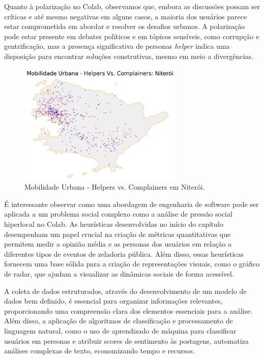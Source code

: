 Quanto à polarização no Colab, observamos que, embora as discussões possam ser críticas e até mesmo negativas em alguns casos, a maioria dos usuários parece estar comprometida em abordar e resolver os desafios urbanos. A polarização pode estar presente em debates políticos e em tópicos sensíveis, como corrupção e gentrificação, mas a presença significativa de personas \textit{helper} indica uma disposição para encontrar soluções construtivas, mesmo em meio a divergências.

\begin{figure}[htb]
	\centering
	\includegraphics[width=0.7\textwidth]{images/network_niteroi_personas_plot.png}
	\caption{Mobilidade Urbana - Helpers vs. Complainers em Niterói.}
	\label{fig:network_niteroi_personas_plot}
\end{figure}

É interessante observar como uma abordagem de engenharia de software pode ser aplicada a um problema social complexo como a análise de pressão social hiperlocal no Colab. As heurísticas desenvolvidas no início do capítulo desempenham um papel crucial na criação de métricas quantitativas que permitem medir a opinião média e as personas dos usuários em relação a diferentes tipos de eventos de zeladoria pública. Além disso, essas heurísticas fornecem uma base sólida para a criação de representações visuais, como o gráfico de radar, que ajudam a visualizar as dinâmicas sociais de forma acessível.

A coleta de dados estruturados, através do desenvolvimento de um modelo de dados bem definido, é essencial para organizar informações relevantes, proporcionando uma compreensão clara dos elementos essenciais para a análise. Além disso, a aplicação de algoritmos de classificação e processamento de linguagem natural, como o uso de aprendizado de máquina para classificar usuários em personas e atribuir scores de sentimento às postagens, automatiza análises complexas de texto, economizando tempo e recursos.

